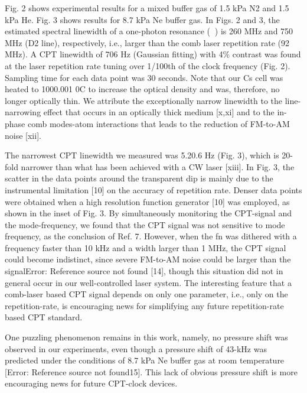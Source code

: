 \documentclass[%
reprint,  
aps,
prl,
showpacs,
]{revtex4}
\begin{document}
Fig. 2 shows experimental results for a mixed buffer gas of 1.5 kPa N2 and 1.5 kPa He. 
Fig. 3 shows results for 8.7 kPa Ne buffer gas. In Figs. 2 and 3, the estimated 
spectral linewidth of a one-photon resonance () is 260 MHz and 750 MHz (D2 line), 
respectively, i.e., larger than the comb laser repetition rate (92 MHz). A CPT 
linewidth of 706 Hz (Gaussian fitting) with 4\% contrast was found at the laser 
repetition rate tuning over 1/100th of the clock frequency (Fig. 2). Sampling 
time for each data point was 30 seconds. Note that our Cs cell was heated to 
1000.001 0C to increase the optical density and was, therefore, no longer optically 
thin. We attribute the exceptionally narrow linewidth to the line-narrowing effect 
that occurs in an optically thick medium [x,xi] and to the in-phase comb modes-atom 
interactions that leads to the reduction of FM-to-AM noise [xii]. 

The narrowest CPT linewidth we measured was 5.20.6 Hz (Fig. 3), which is 20-fold 
narrower than what has been achieved with a CW laser [xiii]. In Fig. 3, the 
scatter in the data points around the transparent dip is mainly due to the 
instrumental limitation [10] on the accuracy of repetition rate. Denser data 
points were obtained when a high resolution function generator [10] was employed, 
as shown in the inset of Fig. 3. By simultaneously monitoring the CPT-signal and
the mode-frequency, we found that the CPT signal was not sensitive to mode frequency, 
as the conclusion of Ref. 7. However, when the fn was dithered with a frequency faster 
than 10 kHz and a width larger than 1 MHz, the CPT signal could become indistinct, 
since severe FM-to-AM noise could be larger than the signalError: Reference source 
not found [14], though this situation did not in general occur in our well-controlled 
laser system. The interesting feature that a comb-laser based CPT signal depends on
 only one parameter, i.e., only on the repetition-rate, is encouraging news for 
simplifying any future repetition-rate based CPT standard. 

One puzzling phenomenon remains in this work, namely, no pressure shift was observed 
in our experiments, even though a pressure shift of 43-kHz was predicted under the 
conditions of 8.7 kPa Ne buffer gas at room temperature [Error: Reference source not 
found15]. This lack of obvious pressure shift is more encouraging news for future 
CPT-clock devices.
\end{document}
